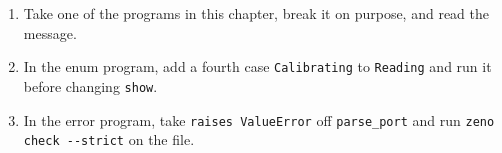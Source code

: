\begin{tryit}
\begin{enumerate}
\item Take one of the programs in this chapter, break it on purpose,
  and read the message.
\item In the enum program, add a fourth case \verb|Calibrating| to
  \verb|Reading| and run it before changing \verb|show|.
\item In the error program, take \verb|raises ValueError| off
  \verb|parse_port| and run \verb|zeno check --strict| on the file.
\end{enumerate}
\end{tryit}

